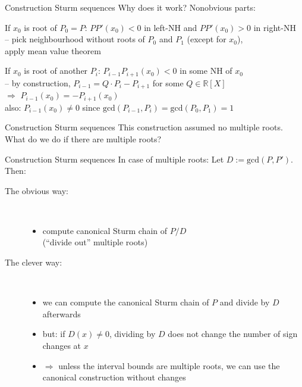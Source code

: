 \documentclass[%
	sans,			%
	mathsans,		%
	10pt,
	t		%
	slidescentered,%
]{beamer}
\newcommand{\RR}{\mathbb{R}}
\begin{document}
\begin{frame}{Construction Sturm sequences}
Why does it work? Nonobvious parts:\\[3mm]\pause

If $x_0$ is root of $P_0 = P$: $PP'(x_0) < 0$ in left-NH and $PP'(x_0) > 0$ in right-NH\\
-- pick neighbourhood without roots of $P_0$ and $P_1$ (except for $x_0$),\\
\hskip3mm apply mean value theorem\\[3mm]\pause

If $x_0$ is root of another $P_i$: $P_{i-1}P_{i+1}(x_0) < 0$ in some NH of $x_0$\\
-- by construction, $P_{i-1} = Q\cdot P_i - P_{i+1}$ for some $Q\in\RR[X]$\\
\hskip3mm$\Longrightarrow$ $P_{i-1}(x_0) = -P_{i+1}(x_0)$\\
\hskip3mm also: $P_{i-1}(x_0)\neq 0$ since $\mathrm{gcd}(P_{i-1}, P_i) = \mathrm{gcd}(P_0,P_1) = 1$
\end{frame}

\begin{frame}{Construction Sturm sequences}
This construction assumed no multiple roots.\\
What do we do if there are multiple roots?
\end{frame}

\begin{frame}{Construction Sturm sequences}
In case of multiple roots: Let $D := \mathrm{gcd}(P,P')$. Then:\pause
\begin{description}
\item[The obvious way:]\ \\
\begin{itemize}
\item compute canonical Sturm chain of $P / D$\\ (\enquote{divide out} multiple roots)
\end{itemize}\pause
\item[The clever way:]\ \\
\begin{itemize}
\item we can compute the canonical Sturm chain of $P$ and divide by $D$ afterwards\pause
\item but: if $D(x)\neq 0$, dividing by $D$ does not change the number of sign changes at $x$\pause
\item $\Longrightarrow$ unless the interval bounds are multiple roots, we can use the canonical construction without changes
\end{itemize}
\end{description}
\end{frame}
\end{document}
